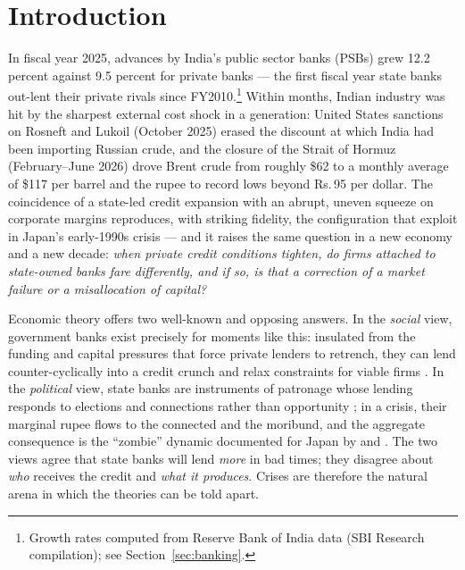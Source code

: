 \documentclass[12pt]{article}
\newcommand{\rupee}{Rs.\,}
\begin{document}
\newpage

\section{Introduction}\label{sec:intro}

In fiscal year 2025, advances by India's public sector banks (PSBs) grew 12.2 percent
against 9.5 percent for private banks --- the first fiscal year state banks out-lent their
private rivals since FY2010.\footnote{Growth rates computed from Reserve Bank of India
data (SBI Research compilation); see Section~\ref{sec:banking}.}
Within months, Indian industry was hit by the sharpest external cost shock in a generation:
United States sanctions on Rosneft and Lukoil (October 2025) erased the discount at which
India had been importing Russian crude, and the closure of the Strait of Hormuz
(February--June 2026) drove Brent crude from roughly \$62 to a monthly average of \$117 per
barrel and the rupee to record lows beyond \rupee 95 per dollar. The coincidence of a
state-led credit expansion with an abrupt, uneven squeeze on corporate margins reproduces,
with striking fidelity, the configuration that \citet{lin2015government} exploit in Japan's
early-1990s crisis --- and it raises the same question in a new economy and a new decade:
\emph{when private credit conditions tighten, do firms attached to state-owned banks fare
differently, and if so, is that a correction of a market failure or a misallocation of
capital?}

Economic theory offers two well-known and opposing answers. In the \emph{social} view,
government banks exist precisely for moments like this: insulated from the funding and
capital pressures that force private lenders to retrench, they can lend counter-cyclically
into a credit crunch and relax constraints for viable firms
\citep{hoshi1991,khwaja2008}. In the \emph{political} view, state banks are instruments of
patronage whose lending responds to elections and connections rather than opportunity
\citep{laporta2002,sapienza2004,dinc2005,cole2009}; in a crisis, their marginal rupee flows
to the connected and the moribund, and the aggregate consequence is the ``zombie'' dynamic
documented for Japan by \citet{peek2005} and \citet{caballero2008}. The two views agree
that state banks will lend \emph{more} in bad times; they disagree about \emph{who} receives
the credit and \emph{what it produces}. Crises are therefore the natural arena in which the
theories can be told apart.
\end{document}
